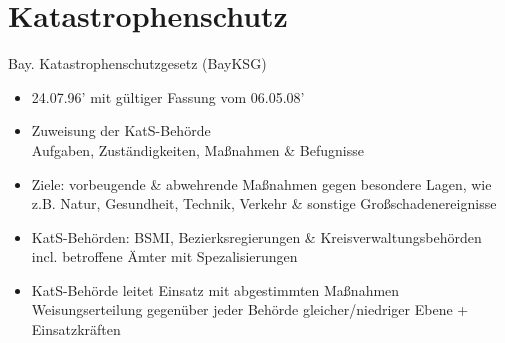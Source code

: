 \section{Katastrophenschutz}
\begin{sectionbox}{Bay. Katastrophenschutzgesetz (BayKSG)}
    \begin{itemize}
        \item 24.07.96' mit gültiger Fassung vom 06.05.08'
        \item Zuweisung der KatS-Behörde\\
        \ra Aufgaben, Zuständigkeiten, Maßnahmen \& Befugnisse
        \item Ziele: vorbeugende \& abwehrende Maßnahmen gegen besondere Lagen, wie z.B. Natur, Gesundheit, Technik, Verkehr \& sonstige Großschadenereignisse
        \item KatS-Behörden: BSMI, Bezierksregierungen \& Kreisverwaltungsbehörden\\
        \ra incl. betroffene Ämter mit Spezalisierungen
        \item KatS-Behörde leitet Einsatz mit abgestimmten Maßnahmen\\
        \ra Weisungserteilung gegenüber jeder Behörde gleicher/niedriger Ebene + Einsatzkräften
    \end{itemize}
\end{sectionbox}
